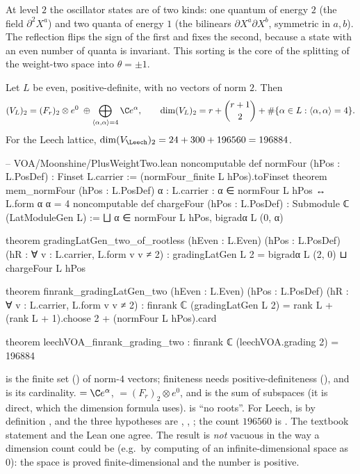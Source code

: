 \begin{physics}
At level $2$ the oscillator states are of two kinds: one quantum of energy $2$ (the field $\partial^2X^a$) and two quanta of energy $1$ (the bilinears $\partial X^a\partial X^b$, symmetric in $a,b$). The reflection flips the sign of the first and fixes the second, because a state with an even number of quanta is invariant. This sorting is the core of the splitting of the weight-two space into $\theta=\pm1$.
\end{physics}

\begin{theorem}\label{ch04:thm:wt2rootless}
Let $L$ be even, positive-definite, with no vectors of norm $2$. Then
\begin{equation*}
  (V_L)_2=(F_r)_2\otimes e^0\;\oplus\bigoplus_{\langle\alpha,\alpha\rangle=4}\C e^\alpha,
  \qquad
  \dim(V_L)_2=r+\binom{r+1}{2}+\#\{\alpha\in L:\langle\alpha,\alpha\rangle=4\}.
\end{equation*}
For the Leech lattice, $\dim(V_\Leech)_2=24+300+196560=196884$.
\end{theorem}

\begin{leancode}
-- VOA/Moonshine/PlusWeightTwo.lean
noncomputable def normFour (hPos : L.PosDef) : Finset L.carrier := (normFour_finite L hPos).toFinset
theorem mem_normFour (hPos : L.PosDef) {α : L.carrier} : α ∈ normFour L hPos ↔ L.form α α = 4
noncomputable def chargeFour (hPos : L.PosDef) : Submodule ℂ (LatModuleGen L) :=
  ⨆ α ∈ normFour L hPos, bigradα L (0, α)

theorem gradingLatGen_two_of_rootless (hEven : L.Even) (hPos : L.PosDef)
    (hR : ∀ v : L.carrier, L.form v v ≠ 2) :
    gradingLatGen L 2 = bigradα L (2, 0) ⊔ chargeFour L hPos

theorem finrank_gradingLatGen_two (hEven : L.Even) (hPos : L.PosDef)
    (hR : ∀ v : L.carrier, L.form v v ≠ 2) :
    finrank ℂ (gradingLatGen L 2)
      = rank L + (rank L + 1).choose 2 + (normFour L hPos).card

theorem leechVOA_finrank_grading_two : finrank ℂ (leechVOA.grading 2) = 196884
\end{leancode}

\begin{dictionary}
 is the finite set () of norm-$4$ vectors; finiteness needs
positive-definiteness (), and  is its cardinality.
 $=\C e^\alpha$,  $=(F_r)_2\otimes e^0$, and  is
the sum of subspaces (it is direct, which the dimension formula uses).  is ``no roots''.
For Leech,  is by definition , and the three
hypotheses are , , ; the count $196560$ is
. The textbook statement and the Lean one agree. The result is
\emph{not} vacuous in the way a dimension count could be (e.g.\ by computing  of an
infinite-dimensional space as $0$): the space is proved finite-dimensional and the number is
positive.
\end{dictionary}

